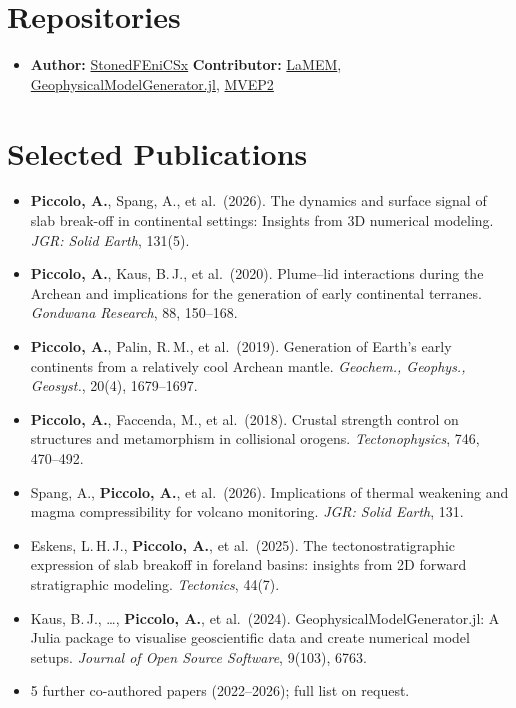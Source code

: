 \documentclass[11pt,a4paper,sans]{moderncv}
\begin{document}

\section{Repositories}
\vspace{1pt}
\begin{itemize}
\item \textbf{Author:} \href{https://github.com/APiccolo89/StonedFenicsx}{StonedFEniCSx} \textbar{} \textbf{Contributor:} \href{https://github.com/UniMainzGeo/LaMEM}{LaMEM}, \href{https://github.com/JuliaGeodynamics/GeophysicalModelGenerator.jl}{GeophysicalModelGenerator.jl}, \href{https://bitbucket.org/bkaus/mvep2/}{MVEP2}
\end{itemize}

\section{Selected Publications}
\vspace{1pt}
{\small
\begin{itemize}
\item \textbf{Piccolo, A.}, Spang, A., et al.\ (2026). The dynamics and surface signal of slab break-off in continental settings: Insights from 3D numerical modeling. \textit{JGR: Solid Earth}, 131(5).
\item \textbf{Piccolo, A.}, Kaus, B.\,J., et al.\ (2020). Plume--lid interactions during the Archean and implications for the generation of early continental terranes. \textit{Gondwana Research}, 88, 150--168.
\item \textbf{Piccolo, A.}, Palin, R.\,M., et al.\ (2019). Generation of Earth's early continents from a relatively cool Archean mantle. \textit{Geochem., Geophys., Geosyst.}, 20(4), 1679--1697.
\item \textbf{Piccolo, A.}, Faccenda, M., et al.\ (2018). Crustal strength control on structures and metamorphism in collisional orogens. \textit{Tectonophysics}, 746, 470--492.
\item Spang, A., \textbf{Piccolo, A.}, et al.\ (2026). Implications of thermal weakening and magma compressibility for volcano monitoring. \textit{JGR: Solid Earth}, 131.
\item Eskens, L.\,H.\,J., \textbf{Piccolo, A.}, et al.\ (2025). The tectonostratigraphic expression of slab breakoff in foreland basins: insights from 2D forward stratigraphic modeling. \textit{Tectonics}, 44(7).
\item Kaus, B.\,J., \ldots, \textbf{Piccolo, A.}, et al.\ (2024). GeophysicalModelGenerator.jl: A Julia package to visualise geoscientific data and create numerical model setups. \textit{Journal of Open Source Software}, 9(103), 6763.
\item[] 5 further co-authored papers (2022--2026); full list on request.
\end{itemize}}
\end{document}
